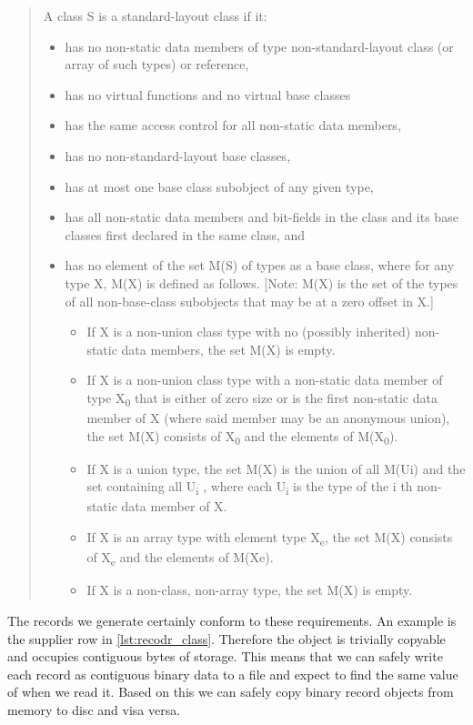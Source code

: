 \begin{quote}
A class S is a standard-layout class if it:
\begin{itemize}
\item has no non-static data members of type non-standard-layout class (or
array of such types) or reference,
\item has no virtual functions and no virtual base classes
\item has the same access control for all non-static data members,
\item has no non-standard-layout base classes,
\item has at most one base class subobject of any given type,
\item has all non-static data members and bit-fields in the class and its
base classes first declared in the same class, and
\item has no element of the set M(S) of types as a base class, where for
any type X, M(X) is defined as follows. [Note: M(X) is the set of
the types of all non-base-class subobjects that may be at a zero
offset in X.]
\begin{itemize}
\item If X is a non-union class type with no (possibly inherited)
non-static data members, the set M(X) is empty.
\item If X is a non-union class type with a non-static data member of
type X\textsubscript{0} that is either of zero size or is the first non-static
data member of X (where said member may be an anonymous union),
the set M(X) consists of X\textsubscript{0} and the elements of M(X\textsubscript{0}).
\item If X is a union type, the set M(X) is the union of all M(Ui) and
the set containing all U\textsubscript{i} , where each U\textsubscript{i} is the type of the i
th non-static data member of X.
\item If X is an array type with element type X\textsubscript{e}, the set M(X) consists
of X\textsubscript{e} and the elements of M(Xe).
\item If X is a non-class, non-array type, the set M(X) is empty.
\end{itemize}
\end{itemize}
\end{quote}

The records we generate certainly conform to these requirements. An
example is the supplier row in \ref{lst:recodr_class}. Therefore the
object is trivially copyable and occupies contiguous bytes of
storage. This means that we can safely write each record  as
 contiguous binary data to a file and expect to find the
same value of  when we read it. Based on this we can safely copy
binary record objects from memory to disc and visa versa.

